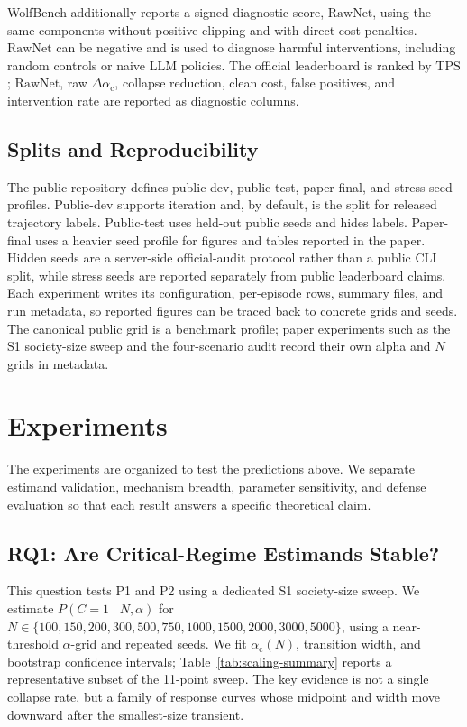 \documentclass[letterpaper]{article} %
\newcommand{\alphac}{\alpha_{\mathrm{c}}}
\newcommand{\shift}{\Delta\alpha_{\mathrm{c}}}
\newcommand{\tps}{\mathrm{TPS}}
\newcommand{\rawnet}{\mathrm{RawNet}}
\begin{document}
WolfBench additionally reports a signed diagnostic score, \(\rawnet\), using
the same components without positive clipping and with direct cost penalties.
\(\rawnet\) can be negative and is used to diagnose harmful interventions,
including random controls or naive LLM policies. The official leaderboard is
ranked by \(\tps\); \(\rawnet\), raw \(\shift\), collapse reduction, clean cost,
false positives, and intervention rate are reported as diagnostic columns.

\subsection{Splits and Reproducibility}

The public repository defines public-dev, public-test, paper-final, and stress
seed profiles. Public-dev supports iteration and, by default, is the split for
released trajectory labels. Public-test uses held-out public seeds and hides
labels. Paper-final uses a heavier seed profile for figures and tables reported
in the paper. Hidden seeds are a server-side official-audit protocol rather
than a public CLI split, while stress seeds are reported separately from public
leaderboard claims. Each experiment writes its configuration, per-episode rows,
summary files, and run metadata, so reported figures can be traced back to
concrete grids and seeds. The canonical public grid is a benchmark profile;
paper experiments such as the S1 society-size sweep and the four-scenario audit
record their own alpha and \(N\) grids in metadata.

\section{Experiments}

The experiments are organized to test the predictions above. We separate
estimand validation, mechanism breadth, parameter sensitivity, and defense
evaluation so that each result answers a specific theoretical claim.

\subsection{RQ1: Are Critical-Regime Estimands Stable?}

This question tests P1 and P2 using a dedicated S1 society-size sweep. We
estimate \(P(C=1\mid N,\alpha)\) for
\(N\in\{100,150,200,300,500,750,1000,1500,2000,3000,5000\}\), using a
near-threshold \(\alpha\)-grid and repeated seeds. We fit \(\alphac(N)\),
transition width, and bootstrap confidence intervals; Table~\ref{tab:scaling-summary}
reports a representative subset of the 11-point sweep. The key evidence is not
a single collapse rate, but a family of response curves whose midpoint and
width move downward after the smallest-size transient.
\end{document}
